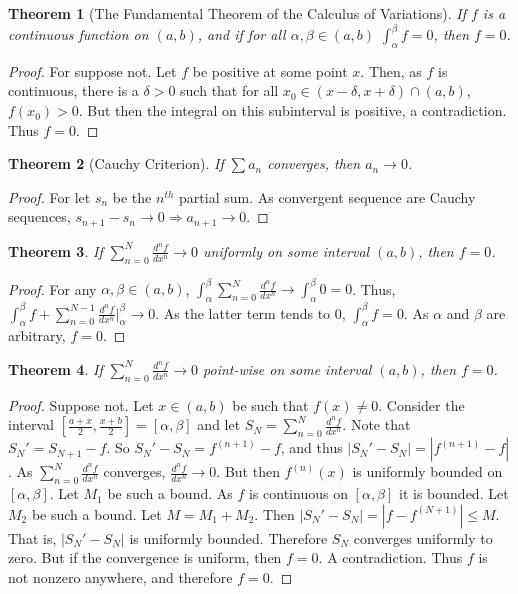 \documentclass[oneside]{book}
\theoremstyle{mystyle}
\newtheorem{theorem}{Theorem}[section]
\begin{document}
\begin{theorem}[The Fundamental Theorem of the Calculus of Variations]
If $f$ is a continuous function on $(a,b)$, and if for all $\alpha,\beta\in (a,b)$ $\int_{\alpha}^{\beta}f = 0$, then $f=0$.
\end{theorem}
\begin{proof}
For suppose not. Let $f$ be positive at some point $x$. Then, as $f$ is continuous, there is a $\delta>0$ such that for all $x_0\in (x-\delta,x+\delta)\cap(a,b)$, $f(x_0)>0$. But then the integral on this subinterval is positive, a contradiction. Thus $f=0$.
\end{proof}

\begin{theorem}[Cauchy Criterion]
If $\sum a_n$ converges, then $a_n \rightarrow 0$.
\end{theorem}
\begin{proof}
For let $s_n$ be the $n^{th}$ partial sum. As convergent sequence are Cauchy sequences, $s_{n+1}-s_n \rightarrow 0\Rightarrow a_{n+1}\rightarrow 0$.
\end{proof}

\begin{theorem}
If $\sum_{n=0}^{N} \frac{d^{n}f}{dx^n} \rightarrow 0$ uniformly on some interval $(a,b)$, then $f=0$.
\end{theorem}
\begin{proof}
For any $\alpha, \beta\in (a,b)$, $\int_{\alpha}^{\beta} \sum_{n=0}^{N} \frac{d^{n}f}{dx^n} \rightarrow \int_{\alpha}^{\beta} 0 = 0$. Thus, $\int_{\alpha}^{\beta} f + \sum_{n=0}^{N-1} \frac{d^n f}{dx^n}\bigg|_{\alpha}^{\beta} \rightarrow 0$. As the latter term tends to $0$, $\int_{\alpha}^{\beta} f = 0$. As $\alpha$ and $\beta$ are arbitrary, $f=0$.
\end{proof}

\begin{theorem}
If $\sum_{n=0}^{N} \frac{d^n f}{dx^n} \rightarrow 0$ point-wise on some interval $(a,b)$, then $f=0$.
\end{theorem}
\begin{proof}
Suppose not. Let $x\in (a,b)$ be such that $f(x)\ne 0$. Consider the interval $[\frac{a+x}{2},\frac{x+b}{2}]=[\alpha,\beta]$ and let $S_N =\sum_{n=0}^{N} \frac{d^n f}{dx^n}$. Note that $S_N' = S_{N+1}-f$. So $S_N' - S_N = f^{(n+1)}-f$, and thus $|S_N'-S_N| = |f^{(n+1)}-f|$. As $\sum_{n=0}^{N} \frac{d^n f}{dx^n}$ converges, $\frac{d^n f}{dx^n} \rightarrow 0$. But then $f^{(n)}(x)$ is uniformly bounded on $[\alpha,\beta]$. Let $M_1$ be such a bound. As $f$ is continuous on $[\alpha,\beta]$ it is bounded. Let $M_2$ be such a bound. Let $M=M_1+M_2$. Then $|S_N'-S_N| = |f-f^{(N+1)}|\leq M$. That is, $|S_N'-S_N|$ is uniformly bounded. Therefore $S_N$ converges uniformly to zero. But if the convergence is uniform, then $f=0$. A contradiction. Thus $f$ is not nonzero anywhere, and therefore $f=0$.
\end{proof}
\end{document}
